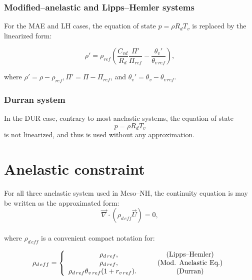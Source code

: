 \subsubsection{Modified--anelastic and Lipps--Hemler systems}

For the MAE and LH cases, the equation of state $p=\rho R_d T_v$ is replaced by
the linearized form:

\begin{equation}
\rho ' =  \rho_{ref} \left( \dfrac{C_{vd}}{R_d}\dfrac{\Pi
'}{\Pi_{ref}} - \dfrac{\theta_v '}{\theta_{v\,ref}} \right),
\label{StateEq}
\end{equation}

where $\rho '= \rho - \rho_{ref}, \Pi '=\Pi - \Pi_{ref}$, and
$\theta_v '= \theta_v - \theta_{v\,ref}$.

\subsubsection{Durran system}

In the DUR case, contrary to most anelastic systems, the equation of state
\begin{equation}
p=\rho R_d T_v
\end{equation}
is not linearized, and thus is used without any approximation.

\section{Anelastic constraint}

For all three anelastic system used in Meso--NH, the continuity equation is may be
written as the approximated form:
\begin{equation}
\vec{ \nabla} \cdot
(\rho_{d\,eff} \vec{U}) = 0, \label{anelcons}
\end{equation}
\\
where $\rho_{d\,eff}$ is a convenient compact notation for:

%
\parbox{15cm}{
\begin{displaymath}
\rho_{d\,eff} = \left\{
\begin{array}{r@{\quad}cc}
\rho_{d\,ref}, \,\,\,\,\,\,\,\,\,\, \,\,\,\,\,\,
              & \quad &\mbox{(Lipps--Hemler)} \\
\rho_{d\,ref}, \,\,\,\,\,\,\,\,\,\, \,\,\,\,\,\,
              & \quad &\mbox{(Mod. Anelastic Eq.)}\\
\rho_{d\,ref} \theta_{v\,ref} (1+r_{v\,ref}).
              & \quad  &\mbox{(Durran)} 
\end{array}
\right.
\end{displaymath}
}
\hfill
\parbox{1cm}{
\begin{eqnarray}
\ \label{Lhconti} \\ \label{MAEconti}   \\ \label{DUconti}
\end{eqnarray}
}
%


